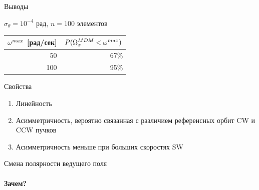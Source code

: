 \documentclass[14pt]{beamer}
\begin{document}
\begin{frame}{Выводы}
	\begin{block}{$\sigma_\theta = 10^{-4}$ рад, $n=100$ элементов}
		\begin{tabular}{r|r}
			\hline
			$\omega^{max}$ [рад/сек] & $P(\Omega_x^{MDM} < \omega^{max})$\\
			\hline
			50  & 67\%\\
			100 & 95\%\\
			\hline
		\end{tabular}
	\end{block}
	\begin{block}{Свойства}
		\begin{enumerate}
			\item Линейность
			\item Асимметричность, вероятно связанная с различием референсных орбит CW и CCW пучков
			\item Асимметричность меньше при больших скоростях SW
		\end{enumerate}
	\end{block}
\end{frame}
\begin{frame}{Смена полярности ведущего поля}
	\framesubtitle{Зачем?}\centering
\end{frame}
\end{document}
